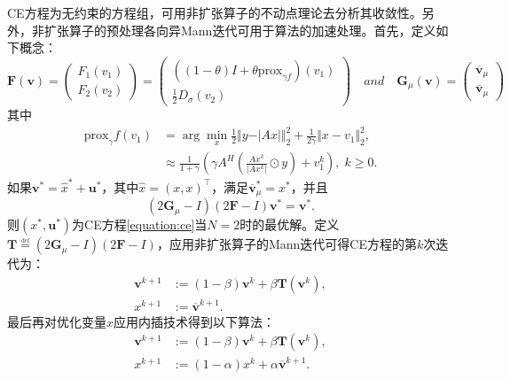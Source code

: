 CE方程为无约束的方程组，可用非扩张算子的不动点理论去分析其收敛性。另外，非扩张算子的预处理各向异Mann迭代可用于算法的加速处理。首先，定义如下概念：
\begin{equation} \label{equation:agent}
	\mathbf{F}(\mathbf{v})
	=
	\begin{pmatrix}
		F_1(v_1) \\ F_2(v_2)
	\end{pmatrix} 
	=	
	\begin{pmatrix}
		((1-\theta)I+\theta\text{prox}_{\gamma{f}})(v_1) \\ \frac{1}{2}D_{\sigma}(v_2)
	\end{pmatrix} 
	\quad and \quad
	\mathbf{G}_{\mu}(\mathbf{v})
	=
	\begin{pmatrix}
		\overline{\mathbf{v}}_{\mu} \\ \overline{\mathbf{v}}_{\mu} 
	\end{pmatrix} 
\end{equation}
其中
\begin{equation} \label{equation:3-17}
	\begin{aligned}
		\text{prox}_\gamma{f}(v_1)&=\arg\min_{x}
		\frac{1}{2}{\Vert{y-\vert{Ax}\vert}\Vert_2^2} +\frac{1}{2\gamma}{\Vert{x-v_1}\Vert_2^2}, \\
		&\approx\frac{1}{1+\gamma}\left({\gamma A^{\mathit{H}}\left(\frac{Ax^k}{\vert{Ax^k}\vert}\odot{y}\right)}+v_1^k\right),\; k\geq{0}.
	\end{aligned}
\end{equation}
如果$\mathbf{v}^*=\hat{x}^*+\mathbf{u}^*$，其中$\hat{x}=(x,x)^\top$，满足$\overline{\mathbf{v}}_{\mu}^*=x^*$，并且
\begin{equation} \label{equation:3-18}
	\left({2\mathbf{G}_{\mu}-I}\right)\left({2\mathbf{F}-I}\right)\mathbf{v}^*=\mathbf{v}^*.  
\end{equation}
则$(x^*,\mathbf{u}^*)$为CE方程\ref{equation:ce}当$N=2$时的最优解。定义$\mathbf{T}\overset{\underset{\mathrm{def}}{}}{=}\left({2\mathbf{G}_{\mu}-I}\right)\left({2\mathbf{F}-I}\right)$，应用非扩张算子的Mann迭代可得CE方程的第$k$次迭代为：
\begin{equation} \label{equation:3-19}
	\begin{aligned}
		\mathbf{v}^{k+1}&:=(1-\beta)\mathbf{v}^{k}+\beta\mathbf{T}(\mathbf{v}^{k}),	\\
		x^{k+1}&:=\overline{\mathbf{v}}^{k+1}.
	\end{aligned}
\end{equation}
最后再对优化变量$x$应用内插技术得到以下算法：
\begin{equation} \label{equation:3-20}
	\begin{aligned}
		\mathbf{v}^{k+1}&:=(1-\beta)\mathbf{v}^{k}+\beta\mathbf{T}(\mathbf{v}^{k}),	\\
		x^{k+1}&:=(1-\alpha)x^k + \alpha\overline{\mathbf{v}}^{k+1}.
	\end{aligned}
\end{equation}
